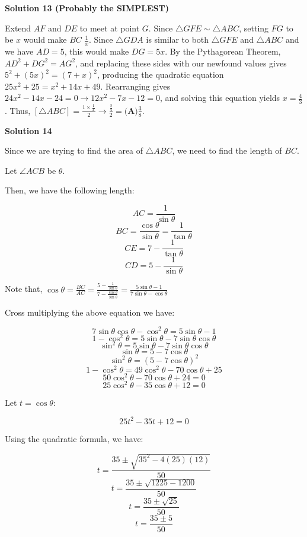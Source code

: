 \begin{enumerate}
\textbf{Solution 13 (Probably the SIMPLEST)}

Extend $AF$ and $DE$ to meet at point $G$. Since $\triangle GFE \sim \triangle ABC$, setting $FG$ to be $x$ would make $BC$ $\frac{1}{x}$. Since $\triangle GDA$ is similar to both $\triangle GFE$ and $\triangle ABC$ and we have $AD=5$, this would make $DG=5x$. By the Pythagorean Theorem, $AD^2 + DG^2 = AG^2$, and replacing these sides with our newfound values gives $5^2 + (5x)^2 = (7+x)^2$, producing the quadratic equation $25x^2 +25=x^2 + 14x +49$. Rearranging gives $24x^2 -14x-24=0 \to 12x^2 -7x-12=0$, and solving this equation yields $x= \frac{4}{3}$. Thus, $[\triangle ABC]=\frac{1 \times \frac{1}{x}}{2} \to \frac{\frac{3}{4}}{2}= \boxed{\textbf{(A)} \frac{3}{8}}$.

 



\textbf{Solution 14}

Since we are trying to find the area of $\triangle ABC$, we need to find the length of $BC$.

 Let $\angle ACB$ be $\theta$.

 Then, we have the following length:

 
 \[AC = \frac{1}{\sin \theta}\]
 \[BC = \frac{\cos \theta}{\sin \theta} = \frac{1}{\tan \theta}\]
 \[CE = 7 - \frac{1}{\tan \theta}\]
 \[CD = 5 - \frac{1}{\sin \theta}\]

 Note that, $\cos \theta = \frac{BC}{AC} = \frac{5 - \frac{1}{\sin \theta}}{7 - \frac{\cos \theta}{\sin \theta}} = \frac{5\sin \theta - 1}{7\sin \theta - \cos \theta}$

 Cross multiplying the above equation we have:

 
 \[7\sin \theta \cos \theta - \cos^2 \theta = 5\sin \theta - 1\]
 \[1 - \cos^2 \theta = 5\sin \theta - 7\sin \theta \cos \theta\]
 \[\sin^2 \theta = 5\sin \theta - 7\sin \theta \cos \theta\]
 \[\sin \theta = 5 - 7\cos \theta\]
 \[\sin^2 \theta = (5 - 7\cos \theta)^2\]
 \[1 - \cos^2 \theta = 49\cos^2 \theta - 70\cos \theta + 25\]
 \[50\cos^2 \theta - 70\cos \theta + 24 = 0\]
 \[25\cos^2 \theta - 35\cos \theta + 12 = 0\]

 Let $t = \cos \theta$:

 
 \[25t^2 - 35t + 12 = 0\]

 Using the quadratic formula, we have:

 
 \[t = \frac{35 \pm \sqrt{35^2 - 4(25)(12)}}{50}\]
 \[t = \frac{35 \pm \sqrt{1225 - 1200}}{50}\]
 \[t = \frac{35 \pm \sqrt{25}}{50}\]
 \[t = \frac{35 \pm 5}{50}\]


\end{enumerate}
